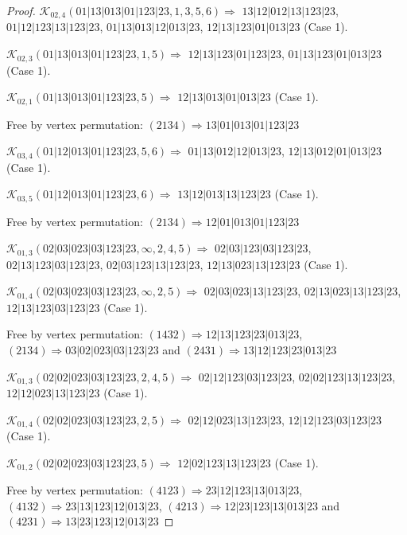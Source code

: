 \documentclass[12pt]{article}
\theoremstyle{plain}
\theoremstyle{definition}
\theoremstyle{remark}
\newcommand{\fancy}[1]{\mathcal{#1}}
\def\K{\fancy{K}}
\begin{document}
\begin{proof}
	
	
	\bigskip
	
	$\K_{02,4}(01|13|013|01|123|23,1, 3, 5, 6)\Rightarrow $ $13|12|012|13|123|23$, $01|12|123|13|123|23$, $01|13|013|12|013|23$, $12|13|123|01|013|23$ (Case 1).
	
	$\K_{02,3}(01|13|013|01|123|23,1, 5)\Rightarrow $ $12|13|123|01|123|23$, $01|13|123|01|013|23$ (Case 1).
	
	$\K_{02,1}(01|13|013|01|123|23,5)\Rightarrow $ $12|13|013|01|013|23$ (Case 1).
	
	
	
	Free by vertex permutation: $(2 1 3 4)\Rightarrow 13|01|013|01|123|23$
	
	
	
	\bigskip
	
	$\K_{03,4}(01|12|013|01|123|23,5, 6)\Rightarrow $ $01|13|012|12|013|23$, $12|13|012|01|013|23$ (Case 1).
	
	$\K_{03,5}(01|12|013|01|123|23,6)\Rightarrow $ $13|12|013|13|123|23$ (Case 1).
	
	
	
	Free by vertex permutation: $(2 1 3 4)\Rightarrow 12|01|013|01|123|23$
	
	
	
	\bigskip
	
	$\K_{01,3}(02|03|023|03|123|23,\infty,2, 4, 5)\Rightarrow $ $02|03|123|03|123|23$, $02|13|123|03|123|23$, $02|03|123|13|123|23$, $12|13|023|13|123|23$ (Case 1).
	
	$\K_{01,4}(02|03|023|03|123|23,\infty,2, 5)\Rightarrow $ $02|03|023|13|123|23$, $02|13|023|13|123|23$, $12|13|123|03|123|23$ (Case 1).
	
	
	
	Free by vertex permutation: $(1 4 3 2)\Rightarrow 12|13|123|23|013|23$, $(2 1 3 4)\Rightarrow 03|02|023|03|123|23$ and $(2 4 3 1)\Rightarrow 13|12|123|23|013|23$
	
	
	
	\bigskip
	
	$\K_{01,3}(02|02|023|03|123|23,2, 4, 5)\Rightarrow $ $02|12|123|03|123|23$, $02|02|123|13|123|23$, $12|12|023|13|123|23$ (Case 1).
	
	$\K_{01,4}(02|02|023|03|123|23,2, 5)\Rightarrow $ $02|12|023|13|123|23$, $12|12|123|03|123|23$ (Case 1).
	
	$\K_{01,2}(02|02|023|03|123|23,5)\Rightarrow $ $12|02|123|13|123|23$ (Case 1).
	
	
	
	Free by vertex permutation: $(4 1 2 3)\Rightarrow 23|12|123|13|013|23$, $(4 1 3 2)\Rightarrow 23|13|123|12|013|23$, $(4 2 1 3)\Rightarrow 12|23|123|13|013|23$ and $(4 2 3 1)\Rightarrow 13|23|123|12|013|23$
	

\end{proof}
\end{document}
